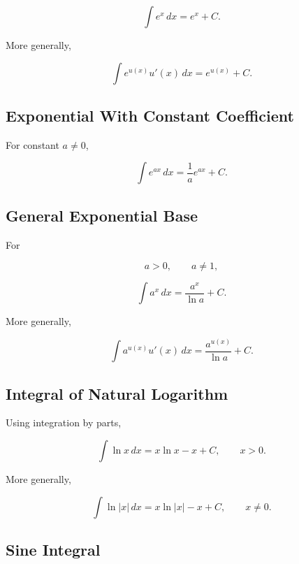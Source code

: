 \[
\boxed{
\int e^x\,dx
=
e^x+C.
}
\]

More generally,

\[
\boxed{
\int
e^{u(x)}
u'(x)
\,dx
=
e^{u(x)}
+
C.
}
\]

\subsection{Exponential With Constant Coefficient}
\label{subsec:exp-constant-coefficient-integral}

For constant \(a\neq0\),

\[
\boxed{
\int e^{ax}\,dx
=
\frac1a e^{ax}+C.
}
\]

\subsection{General Exponential Base}
\label{subsec:general-exponential-integral}

For

\[
a>0,
\qquad
a\neq1,
\]

\[
\boxed{
\int a^x\,dx
=
\frac{
a^x
}{
\ln a
}
+
C.
}
\]

More generally,

\[
\boxed{
\int
a^{u(x)}
u'(x)\,dx
=
\frac{
a^{u(x)}
}{
\ln a
}
+
C.
}
\]

\subsection{Integral of Natural Logarithm}
\label{subsec:integral-natural-logarithm}

Using integration by parts,

\[
\boxed{
\int\ln x\,dx
=
x\ln x-x+C,
\qquad
x>0.
}
\]

More generally,

\[
\boxed{
\int\ln|x|\,dx
=
x\ln|x|-x+C,
\qquad
x\neq0.
}
\]

\subsection{Sine Integral}
\label{subsec:sine-integral-reference}

